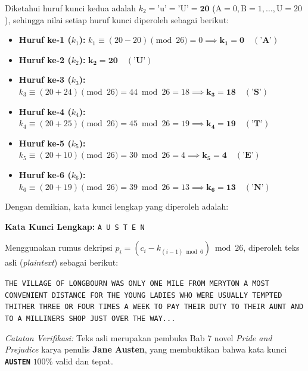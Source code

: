 \documentclass[11pt,a4paper]{article}
\begin{document}
Diketahui huruf kunci kedua adalah $k_2 = \text{'u'} = \text{'U'} = \mathbf{20}$ ($\text{A}=0, \text{B}=1, \dots, \text{U}=20$), sehingga nilai setiap huruf kunci diperoleh sebagai berikut:
\begin{itemize}[leftmargin=*]
    \item \textbf{Huruf ke-1 ($k_1$):} $k_1 \equiv (20 - 20) \pmod{26} = 0 \implies \mathbf{k_1 = 0 \quad (\text{'A'})}$
    \item \textbf{Huruf ke-2 ($k_2$):} $\mathbf{k_2 = 20 \quad (\text{'U'})}$
    \item \textbf{Huruf ke-3 ($k_3$):} $k_3 \equiv (20 + 24) \pmod{26} = 44 \bmod 26 = 18 \implies \mathbf{k_3 = 18 \quad (\text{'S'})}$
    \item \textbf{Huruf ke-4 ($k_4$):} $k_4 \equiv (20 + 25) \pmod{26} = 45 \bmod 26 = 19 \implies \mathbf{k_4 = 19 \quad (\text{'T'})}$
    \item \textbf{Huruf ke-5 ($k_5$):} $k_5 \equiv (20 + 10) \pmod{26} = 30 \bmod 26 = 4 \implies \mathbf{k_5 = 4 \quad (\text{'E'})}$
    \item \textbf{Huruf ke-6 ($k_6$):} $k_6 \equiv (20 + 19) \pmod{26} = 39 \bmod 26 = 13 \implies \mathbf{k_6 = 13 \quad (\text{'N'})}$
\end{itemize}

Dengan demikian, kata kunci lengkap yang diperoleh adalah:
\begin{tcolorbox}[colframe=boxheader]
\centering
\Large \textbf{Kata Kunci Lengkap:} \texttt{A U S T E N}
\end{tcolorbox}

Menggunakan rumus dekripsi $p_i = (c_i - k_{(i-1) \bmod 6}) \bmod 26$, diperoleh teks asli (\textit{plaintext}) sebagai berikut:
\begin{tcolorbox}[colback=white, colframe=black!60]
\small \texttt{THE VILLAGE OF LONGBOURN WAS ONLY ONE MILE FROM MERYTON A MOST CONVENIENT DISTANCE FOR THE YOUNG LADIES WHO WERE USUALLY TEMPTED THITHER THREE OR FOUR TIMES A WEEK TO PAY THEIR DUTY TO THEIR AUNT AND TO A MILLINERS SHOP JUST OVER THE WAY...}
\end{tcolorbox}

\textit{Catatan Verifikasi:} Teks asli merupakan pembuka Bab 7 novel \textit{Pride and Prejudice} karya penulis \textbf{Jane Austen}, yang membuktikan bahwa kata kunci \textbf{\texttt{AUSTEN}} $100\%$ valid dan tepat.

\vspace{0.4cm}
\end{document}
